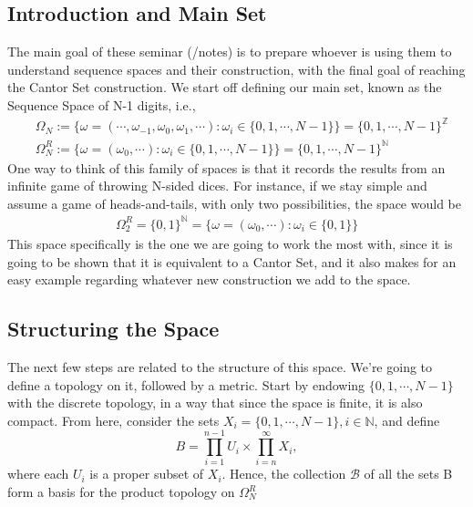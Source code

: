 \documentclass{article}
\begin{document}
\subsection{Introduction and Main Set}
The main goal of these seminar (/notes) is to prepare whoever is using them to understand sequence spaces and their
construction, with the final goal of reaching the Cantor Set construction. We start off defining our main set,
known as the Sequence Space of N-1 digits, i.e., 
 \begin{align*}
   &\Omega_{N} := \{\omega = (\cdots, \omega _{-1}, \omega _{0}, \omega _{1}, \cdots): \omega _{i}\in \{0, 1, \cdots, N-1\}\} = \{0, 1, \cdots, N-1\}^{\mathbb{Z}} \\
   &\Omega _{N}^{R} := \{\omega = (\omega _{0}, \cdots): \omega _{i}\in \{0, 1, \cdots, N-1\}\} = \{0, 1, \cdots, N-1\} ^{\mathbb{N}}
 \end{align*}
One way to think of this family of spaces is that it records the results from an infinite game of throwing N-sided dices.
For instance, if we stay simple and assume a game of heads-and-tails, with only two possibilities, the space would be
 \begin{align*}
 \Omega _{2}^{R} = \{0, 1\} ^{\mathbb{N}} = \{\omega = (\omega _{0}, \cdots): \omega _{i}\in \{0, 1\}\}
 \end{align*}
This space specifically is the one we are going to work the most with, since it is going to be
shown that it is equivalent to a Cantor Set, and it also makes for an easy example regarding whatever
new construction we add to the space.

\subsection{Structuring the Space}
  The next few steps are related to the structure of this space. We're going to define a topology on it, followed 
by a metric. Start by endowing $\{0, 1, \cdots, N-1\}$ with the discrete topology, in a way that
since the space is finite, it is also compact. From here, consider the sets $X _{i} = \{0, 1, \cdots, 
N-1\}, i\in \mathbb{N}$, and define
  $$
    B = \prod\limits_{i=1}^{n-1}U _{i} \times{} \prod\limits_{i=n}^{\infty}X _{i},
  $$ 
where each $U _{i}$ is a proper subset of $X _{i}$. Hence, the collection $\mathcal{B}$ of all the sets
B form a basis for the product topology on $\Omega _{N}^{R}  $
  
\end{document}
